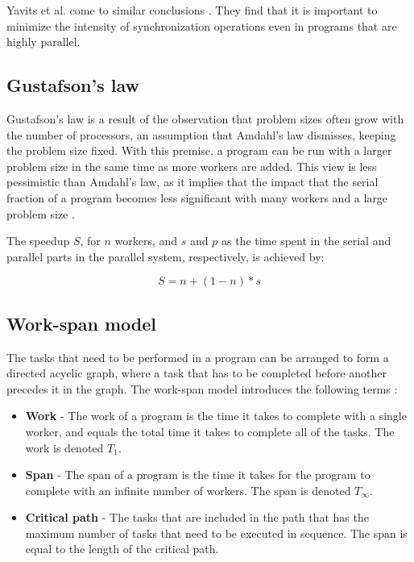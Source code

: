 Yavits et al. come to similar conclusions \cite{yavits_2014_effect_teocasoalims}. They find that it is important to minimize the
intensity of synchronization operations even in programs that are highly parallel.

\subsection{Gustafson's law}
Gustafson's law \cite{gustafson_1988_reevaluating_ral} is a result of the observation that problem sizes often grow with the
number of processors, an assumption that Amdahl's law dismisses, keeping the problem size fixed. With this premise, a program can
be run with a larger problem size in the same time as more workers are added. This view is less pessimistic than Amdahl's law, as
it implies that the impact that the serial fraction of a program becomes less significant with many workers and a large problem
size \cite[p. 61-62]{mccool_2012_structured_spppfec}.

The speedup $S$, for $n$ workers, and $s$ and $p$ as the time spent in the serial and parallel parts in the parallel system,
respectively, is achieved by:

\begin{displaymath}
  S = n + (1-n) * s
\end{displaymath}

\subsection{Work-span model}
The tasks that need to be performed in a program can be arranged to form a directed acyclic graph, where a task that
has to be completed before another precedes it in the graph. The work-span model introduces the following terms
\cite{mccool_2012_structured_spppfec}:
\begin{itemize}
  \item \textbf{Work} - The work of a program is the time it takes to complete with a single worker, and equals the total time it
    takes to complete all of the tasks. The work is denoted $T_1$.
  \item \textbf{Span} - The span of a program is the time it takes for the program to complete with an infinite number of workers.
    The span is denoted $T_\infty$.
  \item \textbf{Critical path} - The tasks that are included in the path that has the maximum number of tasks that need
    to be executed in sequence. The span is equal to the length of the critical path.
\end{itemize}

